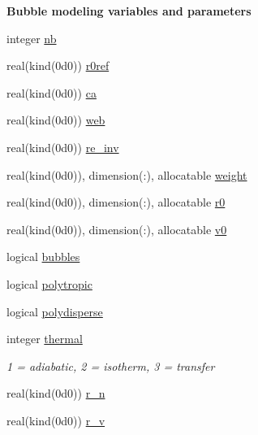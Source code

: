 \begin{Indent}\textbf{ Bubble modeling variables and parameters}\par
\begin{DoxyCompactItemize}
\item 
integer \hyperlink{namespacem__global__parameters_ad76c4758994b52559f478d251dc0cba5}{nb}
\item 
real(kind(0d0)) \hyperlink{namespacem__global__parameters_a24492f9b474683476a342e7ee42c1c6d}{r0ref}
\item 
real(kind(0d0)) \hyperlink{namespacem__global__parameters_a1fcd6cc13ad7f604ef81708716a1feac}{ca}
\item 
real(kind(0d0)) \hyperlink{namespacem__global__parameters_af2ed21959a90158c2459574230cdfcff}{web}
\item 
real(kind(0d0)) \hyperlink{namespacem__global__parameters_a4438313a11564fa911c586d2dee15b8d}{re\+\_\+inv}
\item 
real(kind(0d0)), dimension(\+:), allocatable \hyperlink{namespacem__global__parameters_a121ed97f0ae913d37bce5bbf1c7b2cc2}{weight}
\item 
real(kind(0d0)), dimension(\+:), allocatable \hyperlink{namespacem__global__parameters_a585a72037bbffe12e8d4512a57f52418}{r0}
\item 
real(kind(0d0)), dimension(\+:), allocatable \hyperlink{namespacem__global__parameters_a334b440356a4353d073c43e68c2372da}{v0}
\item 
logical \hyperlink{namespacem__global__parameters_a4a22ed160838f8fbe6bd506f334b8815}{bubbles}
\item 
logical \hyperlink{namespacem__global__parameters_a8d670f2f984167bae71b7b3f12d0908a}{polytropic}
\item 
logical \hyperlink{namespacem__global__parameters_a32791d9d5fef0213f01fc31713b17ae8}{polydisperse}
\item 
integer \hyperlink{namespacem__global__parameters_a17169a5387f8f1efd5ac34cb4eae7c81}{thermal}
\begin{DoxyCompactList}\small\item\em 1 = adiabatic, 2 = isotherm, 3 = transfer \end{DoxyCompactList}\item 
real(kind(0d0)) \hyperlink{namespacem__global__parameters_ae818e88601b1dc579a87e7c0c8cd87cb}{r\+\_\+n}
\item 
real(kind(0d0)) \hyperlink{namespacem__global__parameters_af2ee1ad578115833bb6b8e9550eb5f18}{r\+\_\+v}
\item 

\end{DoxyCompactItemize}
\end{Indent}
